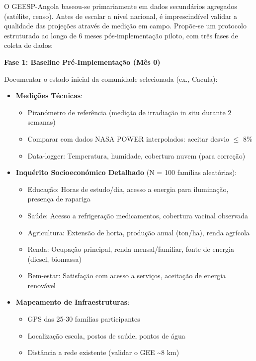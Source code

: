 \documentclass[12pt, a4paper]{article}
\begin{document}
O GEESP-Angola baseou-se primariamente em dados secundários agregados (satélite, censo). 
Antes de escalar a nível nacional, é imprescindível validar a qualidade das projeções 
através de medição em campo. Propõe-se um protocolo estruturado ao longo de 6 meses 
pós-implementação piloto, com três fases de coleta de dados:

\textbf{Fase 1: Baseline Pré-Implementação (Mês 0)}

Documentar o estado inicial da comunidade selecionada (ex., Cacula):

\begin{itemize}
\item \textbf{Medições Técnicas}:
  \begin{itemize}
  \item Piranómetro de referência (medição de irradiação in situ durante 2 semanas)
  \item Comparar com dados NASA POWER interpolados: aceitar desvio \(\leq\) 8\%
  \item Data-logger: Temperatura, humidade, cobertura nuvem (para correção)
  \end{itemize}

\item \textbf{Inquérito Socioeconómico Detalhado} (N = 100 famílias aleatórias):
  \begin{itemize}
  \item Educação: Horas de estudo/dia, acesso a energia para iluminação, presença de rapariga
  \item Saúde: Acesso a refrigeração medicamentos, cobertura vacinal observada
  \item Agricultura: Extensão de horta, produção anual (ton/ha), renda agrícola
  \item Renda: Ocupação principal, renda mensal/familiar, fonte de energia (diesel, biomassa)
  \item Bem-estar: Satisfação com acesso a serviços, aceitação de energia renovável
  \end{itemize}

\item \textbf{Mapeamento de Infraestruturas}:
  \begin{itemize}
  \item GPS das 25-30 famílias participantes
  \item Localização escola, postos de saúde, pontos de água
  \item Distância a rede existente (validar o GEE \textasciitilde{}8 km)
  \end{itemize}
\end{itemize}
\end{document}
